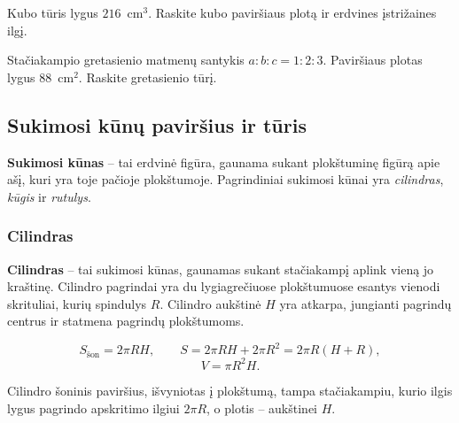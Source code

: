 \begin{exercise}
Kubo tūris lygus $216$~cm$^3$. Raskite kubo paviršiaus plotą ir erdvines įstrižaines ilgį.
\end{exercise}

\begin{exercise}
Stačiakampio gretasienio matmenų santykis $a : b : c = 1 : 2 : 3$. Paviršiaus plotas lygus $88$~cm$^2$. Raskite gretasienio tūrį.
\end{exercise}

\subsection{Sukimosi kūnų paviršius ir tūris}

\begin{definition}
\textbf{Sukimosi kūnas} -- tai erdvinė figūra, gaunama sukant plokštuminę figūrą apie ašį, kuri yra toje pačioje plokštumoje. Pagrindiniai sukimosi kūnai yra \emph{cilindras}, \emph{kūgis} ir \emph{rutulys}.
\end{definition}

\subsubsection*{Cilindras}

\begin{definition}
\textbf{Cilindras} -- tai sukimosi kūnas, gaunamas sukant stačiakampį aplink vieną jo kraštinę. Cilindro pagrindai yra du lygiagrečiuose plokštumuose esantys vienodi skrituliai, kurių spindulys $R$. Cilindro aukštinė $H$ yra atkarpa, jungianti pagrindų centrus ir statmena pagrindų plokštumoms.
\end{definition}

\begin{theorem}
\[
S_{\text{šon}} = 2\pi R H, \qquad S = 2\pi R H + 2\pi R^2 = 2\pi R(H + R),
\]
\[
V = \pi R^2 H.
\]
\end{theorem}

\begin{remark}
Cilindro šoninis paviršius, išvyniotas į plokštumą, tampa stačiakampiu, kurio ilgis lygus pagrindo apskritimo ilgiui $2\pi R$, o plotis -- aukštinei $H$.
\end{remark}

